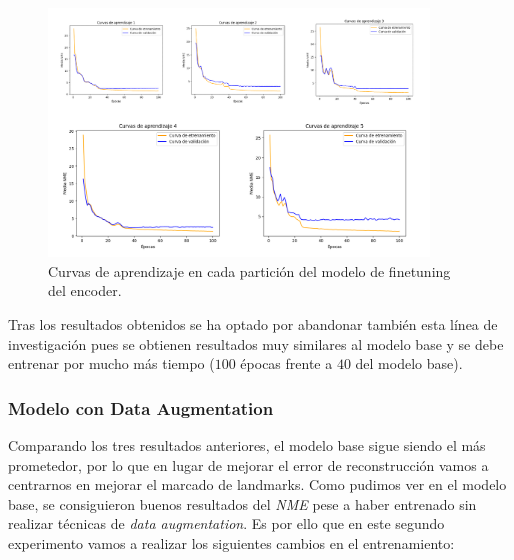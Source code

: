             \begin{figure}[!h]
                \centering
                \includegraphics[width=0.9\textwidth]{img/curvas_decoder.png}
                \caption{Curvas de aprendizaje en cada partición del modelo de finetuning del encoder.}
                \label{fig:curvas_decoder}
            \end{figure}

            \medskip

            \noindent Tras los resultados obtenidos se ha optado por abandonar también esta línea de investigación pues se obtienen resultados muy similares al modelo base y se debe entrenar por mucho más tiempo ($100$ épocas frente a $40$ del modelo base). 

        \subsubsection{Modelo con Data Augmentation}
            \noindent Comparando los tres resultados anteriores, el modelo base sigue siendo el más prometedor, por lo que en lugar de mejorar el error de reconstrucción vamos a centrarnos en mejorar el marcado de landmarks. Como pudimos ver en el modelo base, se consiguieron buenos resultados del \textit{NME} pese a haber entrenado sin realizar técnicas de \textit{data augmentation}. Es por ello que en este segundo experimento vamos a realizar los siguientes cambios en el entrenamiento: 
            
